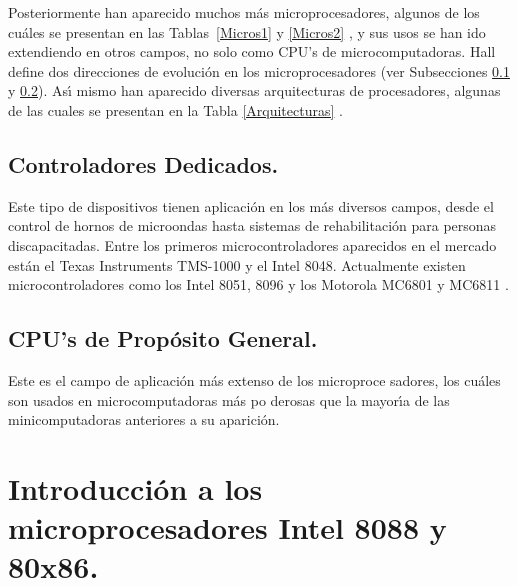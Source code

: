 Posteriormente han aparecido muchos m\'as microprocesadores, algunos de los cu\'ales se %
presentan en las Tablas~\ref{Micros1} y \ref{Micros2} \cite{Micro:Hist}, y sus usos se han %
ido extendiendo en otros campos, no solo como CPU's de microcomputadoras. Hall \cite{Hall} %
define dos direcciones de evoluci\'on en los microprocesadores (ver Subsecciones %
\ref{Subseccion:controladores} y \ref{Subseccion:propogen}). As\'{\i} mismo han aparecido %
diversas arquitecturas de procesadores, algunas de las cuales se presentan en la Tabla %
\ref{Arquitecturas} \cite{Micro:Hist}.


\subsection{Controladores Dedicados.}
\label{Subseccion:controladores}

Este tipo de dispositivos tienen aplicaci\'on en los m\'as diversos campos, desde el control de %
hornos de microondas hasta sistemas de rehabilitaci\'on para personas discapacitadas. Entre los %
primeros microcontroladores aparecidos en el mercado est\'an el Texas Instruments TMS-1000 y el %
Intel 8048. Actualmente existen microcontroladores como los Intel 8051, 8096 y los Motorola %
MC6801 y MC6811 \cite{Hall}.


\subsection{CPU's de Prop\'osito General.}
\label{Subseccion:propogen}

Es\-te es el cam\-po de a\-pli\-ca\-ci\'on m\'as ex\-ten\-so de los mi\-cro\-pro\-ce\-%
sa\-do\-res, los cu\'a\-les son u\-sa\-dos en mi\-cro\-com\-pu\-ta\-do\-ras m\'as po\-%
de\-ro\-sas que la ma\-yo\-r\'{\i}a de las mi\-ni\-com\-pu\-ta\-do\-ras an\-te\-rio\-res %
a su a\-pa\-ri\-ci\'on. 


\section{Introducci\'on a los mi\-cro\-pro\-ce\-sa\-do\-res Intel 8088 y 80x86.}
\label{Seccion:8088y8086}

